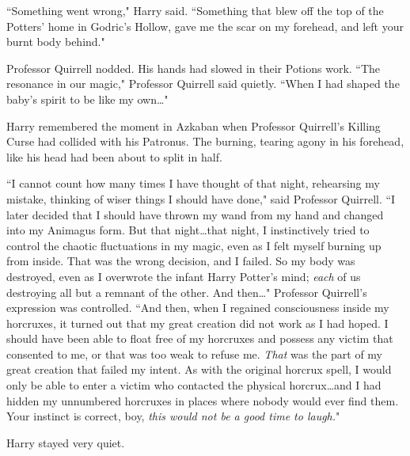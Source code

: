 ``Something went wrong," Harry said. ``Something that blew off the top of the Potters' home in Godric's Hollow, gave me the scar on my forehead, and left your burnt body behind."

Professor Quirrell nodded. His hands had slowed in their Potions work. ``The resonance in our magic," Professor Quirrell said quietly. ``When I had shaped the baby's spirit to be like my own…"

Harry remembered the moment in Azkaban when Professor Quirrell's Killing Curse had collided with his Patronus. The burning, tearing agony in his forehead, like his head had been about to split in half.

``I cannot count how many times I have thought of that night, rehearsing my mistake, thinking of wiser things I should have done," said Professor Quirrell. ``I later decided that I should have thrown my wand from my hand and changed into my Animagus form. But that night…that night, I instinctively tried to control the chaotic fluctuations in my magic, even as I felt myself burning up from inside. That was the wrong decision, and I failed. So my body was destroyed, even as I overwrote the infant Harry Potter's mind; \emph{each} of us destroying all but a remnant of the other. And then…" Professor Quirrell's expression was controlled. ``And then, when I regained consciousness inside my horcruxes, it turned out that my great creation did not work as I had hoped. I should have been able to float free of my horcruxes and possess any victim that consented to me, or that was too weak to refuse me. \emph{That} was the part of my great creation that failed my intent. As with the original horcrux spell, I would only be able to enter a victim who contacted the physical horcrux…and I had hidden my unnumbered horcruxes in places where nobody would ever find them. Your instinct is correct, boy, \emph{this would not be a good time to laugh.}"

Harry stayed very quiet.

